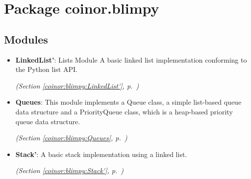 %
%
%


\section{Package coinor.blimpy}

    \label{coinor:blimpy}


\subsection{Modules}

\begin{itemize}
\setlength{\parskip}{0ex}
\item \textbf{LinkedList'}: Lists Module A basic linked list implementation conforming to the Python 
list API.



  \textit{(Section \ref{coinor:blimpy:LinkedList'}, p.~\pageref{coinor:blimpy:LinkedList'})}

\item \textbf{Queues}: This module implements a Queue class, a simple list-based queue data 
structure and a PriorityQueue class, which is a heap-based priority queue 
data structure.



  \textit{(Section \ref{coinor:blimpy:Queues}, p.~\pageref{coinor:blimpy:Queues})}

\item \textbf{Stack'}: A basic stack implementation using a linked list.



  \textit{(Section \ref{coinor:blimpy:Stack'}, p.~\pageref{coinor:blimpy:Stack'})}

\end{itemize}


